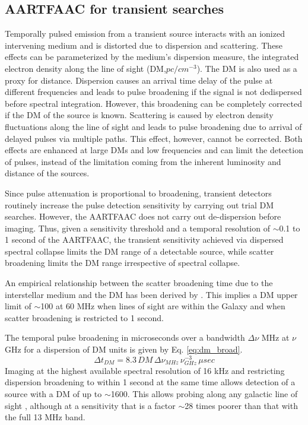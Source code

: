 \documentclass[referee]{aa}
\begin{document}
\subsection{\label{sub:AARTFAAC-for-Transient}AARTFAAC for transient searches}

Temporally pulsed  emission from  a transient source  interacts with  an ionized
intervening medium  and is  distorted due to  dispersion and  scattering. These
effects can be parameterized by  the medium's dispersion measure, the integrated
electron density along the line of  sight (DM,$pc/cm^{-3}$). The DM is also used
as a proxy for distance. Dispersion causes an arrival time delay of the pulse at
different  frequencies and  leads  to pulse  broadening  if the  signal is  not
dedispersed  before  spectral  integration.  However,  this  broadening  can  be
completely corrected if  the DM of the source is known.  Scattering is caused by
electron  density  fluctuations along  the  line of  sight  and leads to  pulse
broadening due  to arrival  of delayed pulses  via multiple paths.  This effect,
however, cannot  be corrected. Both  effects are enhanced  at large DMs  and low
frequencies and  can limit the detection  of pulses, instead  of the limitation
coming from the inherent luminosity and distance of the sources.

Since  pulse  attenuation is  proportional  to  broadening, transient  detectors
routinely  increase the  pulse detection  sensitivity by  carrying out  trial DM
searches.   However,  the  AARTFAAC  does  not carry  out  de-dispersion  before
imaging.   Thus, given  a sensitivity  threshold  and a  temporal resolution  of
$\sim$0.1 to  1 second of the  AARTFAAC, the transient  sensitivity achieved via
dispersed spectral  collapse limits the DM  range of a  detectable source, while
scatter broadening limits the DM range irrespective of spectral collapse.

An  empirical  relationship between  the  scatter  broadening  time due  to  the
interstellar     medium     and    the     DM     has     been    derived     by
\citet{bhat2004multifrequency}. This implies a DM upper limit of $\sim$100 at 60
MHz when  lines of sight  are within the  Galaxy and when scatter  broadening is
restricted to 1 second.

The temporal pulse  broadening in microseconds over a  bandwidth $\Delta\nu$ MHz
at $\nu$ GHz for a dispersion of DM units is given by Eq. \ref{eq:dm_broad}.
\begin{equation}
\Delta t_{DM}=8.3\,DM\,\Delta\nu_{MHz}\,\nu_{GHz}^{-3}\, \mu sec\label{eq:dm_broad}
\end{equation}
Imaging at the  highest available spectral resolution of  16 kHz and restricting
dispersion broadening to within 1 second  at the same time allows detection of a
source with  a DM of up to  $\sim$1600.  This allows probing  along any galactic
line of sight \citep{cordes2002ne2001}, although  at a sensitivity that is a factor  $\sim$28 times poorer than that with the full 13 MHz band.
\end{document}
